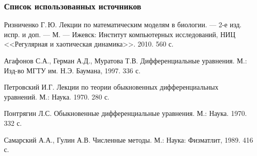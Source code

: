 \documentclass[unicode]{beamer}
\begin{document}
    \begin{frame}
        \frametitle{Список использованных источников}
        \begin{thebibliography}{9}

             Ризниченко Г.\,Ю. Лекции по математическим моделям в биологии. --- 2-е изд. испр. и доп. --- М. --- Ижевск: Институт компьютерных исследований, НИЦ <<Регулярная и хаотическая динамика>>. 2010. 560 с.

             Агафонов С.А., Герман А.Д., Муратова Т.В. Дифференциальные уравнения. М.: Изд-во МГТУ им. Н.Э. Баумана, 1997. 336 с.

             Петровский И.Г. Лекции по теории обыкновенных дифференциальных уравнений. М.: Наука. 1970. 280 с.

             Понтрягин Л.С. Обыкновенные дифференциальные уравнения. М.: Наука. 1970. 332 с.

             Самарский А.А., Гулин А.В. Численные методы. М.: Наука: Физматлит, 1989. 416 с.

        \end{thebibliography}
    \end{frame}
    
\end{document}
